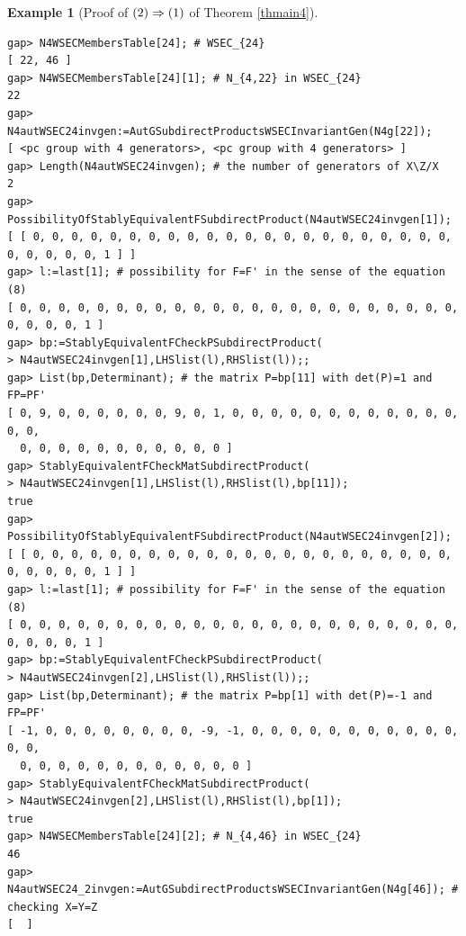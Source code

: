 \documentclass{amsart}
\theoremstyle{plain}
\theoremstyle{definition}
\newtheorem{example}[theorem]{Example}
\theoremstyle{remark}
\begin{document}
\begin{example}[Proof of ${\rm (2)}\Rightarrow {\rm (1)}$ of {Theorem \ref{thmain4}}]
\begin{verbatim}
gap> N4WSECMembersTable[24]; # WSEC_{24}
[ 22, 46 ]
gap> N4WSECMembersTable[24][1]; # N_{4,22} in WSEC_{24}
22
gap> N4autWSEC24invgen:=AutGSubdirectProductsWSECInvariantGen(N4g[22]);
[ <pc group with 4 generators>, <pc group with 4 generators> ]
gap> Length(N4autWSEC24invgen); # the number of generators of X\Z/X
2
gap> PossibilityOfStablyEquivalentFSubdirectProduct(N4autWSEC24invgen[1]);
[ [ 0, 0, 0, 0, 0, 0, 0, 0, 0, 0, 0, 0, 0, 0, 0, 0, 0, 0, 0, 0, 0, 0, 0, 0, 0, 0, 0, 1 ] ]
gap> l:=last[1]; # possibility for F=F' in the sense of the equation (8)
[ 0, 0, 0, 0, 0, 0, 0, 0, 0, 0, 0, 0, 0, 0, 0, 0, 0, 0, 0, 0, 0, 0, 0, 0, 0, 0, 0, 1 ]
gap> bp:=StablyEquivalentFCheckPSubdirectProduct(
> N4autWSEC24invgen[1],LHSlist(l),RHSlist(l));;
gap> List(bp,Determinant); # the matrix P=bp[11] with det(P)=1 and FP=PF'
[ 0, 9, 0, 0, 0, 0, 0, 0, 9, 0, 1, 0, 0, 0, 0, 0, 0, 0, 0, 0, 0, 0, 0, 0, 0, 
  0, 0, 0, 0, 0, 0, 0, 0, 0, 0, 0 ]
gap> StablyEquivalentFCheckMatSubdirectProduct(
> N4autWSEC24invgen[1],LHSlist(l),RHSlist(l),bp[11]);
true
gap> PossibilityOfStablyEquivalentFSubdirectProduct(N4autWSEC24invgen[2]);
[ [ 0, 0, 0, 0, 0, 0, 0, 0, 0, 0, 0, 0, 0, 0, 0, 0, 0, 0, 0, 0, 0, 0, 0, 0, 0, 0, 0, 1 ] ]
gap> l:=last[1]; # possibility for F=F' in the sense of the equation (8)
[ 0, 0, 0, 0, 0, 0, 0, 0, 0, 0, 0, 0, 0, 0, 0, 0, 0, 0, 0, 0, 0, 0, 0, 0, 0, 0, 0, 1 ]
gap> bp:=StablyEquivalentFCheckPSubdirectProduct(
> N4autWSEC24invgen[2],LHSlist(l),RHSlist(l));;
gap> List(bp,Determinant); # the matrix P=bp[1] with det(P)=-1 and FP=PF'
[ -1, 0, 0, 0, 0, 0, 0, 0, 0, -9, -1, 0, 0, 0, 0, 0, 0, 0, 0, 0, 0, 0, 0, 0, 
  0, 0, 0, 0, 0, 0, 0, 0, 0, 0, 0, 0 ]
gap> StablyEquivalentFCheckMatSubdirectProduct(
> N4autWSEC24invgen[2],LHSlist(l),RHSlist(l),bp[1]);
true
gap> N4WSECMembersTable[24][2]; # N_{4,46} in WSEC_{24}
46
gap> N4autWSEC24_2invgen:=AutGSubdirectProductsWSECInvariantGen(N4g[46]); # checking X=Y=Z
[  ]


\end{verbatim}
\end{example}
\end{document}
